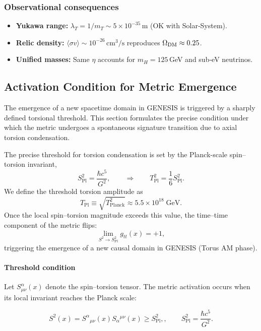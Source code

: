 \documentclass{article}
\newcommand{\Splanck}{S_{\mathrm{Pl}}}
\begin{document}
\subsubsection*{Observational consequences}
\begin{itemize}
  \item \textbf{Yukawa range:} $\lambda_T = 1/m_T \sim 5\times10^{-35}\,$m (OK with Solar‐System).
  \item \textbf{Relic density:} $\langle\sigma v\rangle\sim10^{-26}\,\mathrm{cm^3/s}$ reproduces $\Omega_{\rm DM}\approx0.25$.
  \item \textbf{Unified masses:} Same $\eta$ accounts for $m_H=125\,$GeV and sub‐eV neutrinos.
\end{itemize}




\subsection{Activation Condition for Metric Emergence}
\label{sec:activation-condition}

The emergence of a new spacetime domain in GENESIS is triggered by a sharply defined torsional threshold. This section formulates the precise condition under which the metric undergoes a spontaneous signature transition due to axial torsion condensation.


The precise threshold for torsion condensation is set by the Planck-scale spin–torsion invariant,
\[
S_{\mathrm{Pl}}^2 = \frac{\hbar c^5}{G^2}, \qquad \Rightarrow \qquad T_{\mathrm{Pl}}^2 = \frac{1}{6} S_{\mathrm{Pl}}^2.
\]
We define the threshold torsion amplitude as
\[
T_{\mathrm{Pl}} \equiv \sqrt{T_{\mathrm{Planck}}^2} \approx 5.5 \times 10^{18} \; \mathrm{GeV}.
\]
Once the local spin–torsion magnitude exceeds this value, the time–time component of the metric flips:
\[
\lim_{S^2 \rightarrow \Splanck^2} g_{tt}(x) = +1,
\]
triggering the emergence of a new causal domain in GENESIS (Torus AM phase).


\paragraph{Threshold condition}

Let \( S_{\mu\nu}^\alpha(x) \) denote the spin–torsion tensor. The metric activation occurs when its local invariant reaches the Planck scale:

\[
S^2(x) = S^\alpha{}_{\mu\nu}(x) S_\alpha{}^{\mu\nu}(x) \geq \Splanck^2,, \qquad S_{\mathrm{Pl}}^2 = \frac{\hbar c^5}{G^2}.
\]
\end{document}

